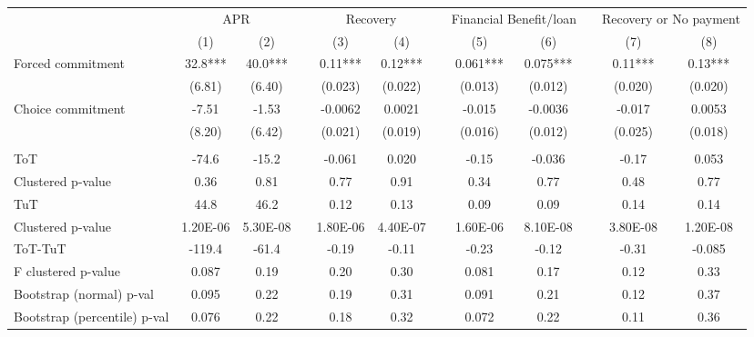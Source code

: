 \begin{tabular}{lccccccccccc}
\toprule
      & \multicolumn{2}{c}{APR} &       & \multicolumn{2}{c}{Recovery} &       & \multicolumn{2}{c}{Financial Benefit/loan} &       & \multicolumn{2}{c}{Recovery or No payment} \\
\cmidrule{2-3}\cmidrule{5-6}\cmidrule{8-9}\cmidrule{11-12}      & (1)   & (2)   &       & (3)   & (4)   &       & (5)   & (6)   &       & (7)   & (8) \\
\midrule
\midrule
Forced commitment & 32.8*** & 40.0*** &       & 0.11*** & 0.12*** &       & 0.061*** & 0.075*** &       & 0.11*** & 0.13*** \\
      & (6.81) & (6.40) &       & (0.023) & (0.022) &       & (0.013) & (0.012) &       & (0.020) & (0.020) \\
Choice commitment & -7.51 & -1.53 &       & -0.0062 & 0.0021 &       & -0.015 & -0.0036 &       & -0.017 & 0.0053 \\
      & (8.20) & (6.42) &       & (0.021) & (0.019) &       & (0.016) & (0.012) &       & (0.025) & (0.018) \\
      &       &       &       &       &       &       &       &       &       &       &  \\
\midrule
\rowcolor[rgb]{ .949,  .949,  .949} ToT   & -74.6 & -15.2 &       & -0.061 & 0.020 &       & -0.15 & -0.036 &       & -0.17 & 0.053 \\
Clustered p-value & 0.36  & 0.81  &       & 0.77  & 0.91  &       & 0.34  & 0.77  &       & 0.48  & 0.77 \\
\rowcolor[rgb]{ .949,  .949,  .949} TuT   & 44.8  & 46.2  &       & 0.12  & 0.13  &       & 0.09  & 0.09  &       & 0.14  & 0.14 \\
Clustered p-value & 1.20E-06 & 5.30E-08 &       & 1.80E-06 & 4.40E-07 &       & 1.60E-06 & 8.10E-08 &       & 3.80E-08 & 1.20E-08 \\
\rowcolor[rgb]{ .949,  .949,  .949} ToT-TuT & -119.4 & -61.4 &       & -0.19 & -0.11 &       & -0.23 & -0.12 &       & -0.31 & -0.085 \\
F clustered p-value & 0.087 & 0.19  &       & 0.20  & 0.30  &       & 0.081 & 0.17  &       & 0.12  & 0.33 \\
Bootstrap (normal) p-val & 0.095 & 0.22  &       & 0.19  & 0.31  &       & 0.091 & 0.21  &       & 0.12  & 0.37 \\
Bootstrap (percentile) p-val & 0.076 & 0.22  &       & 0.18  & 0.32  &       & 0.072 & 0.22  &       & 0.11  & 0.36 \\

\end{tabular}
